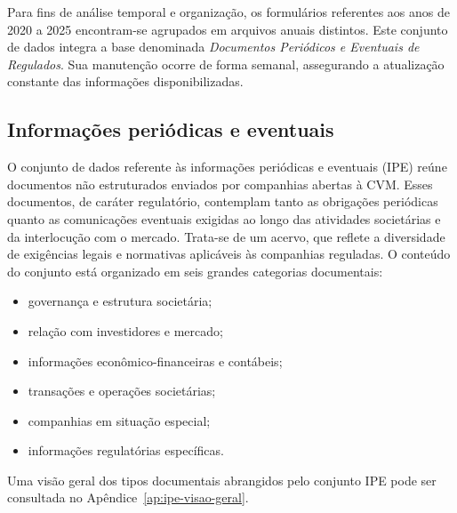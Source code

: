 Para fins de análise temporal e organização, os formulários referentes aos anos de 2020 a 2025 encontram-se agrupados em arquivos anuais distintos. Este conjunto de dados integra a base denominada \textit{Documentos Periódicos e Eventuais de Regulados}. Sua manutenção ocorre de forma semanal, assegurando a atualização constante das informações disponibilizadas.

\subsection{Informações periódicas e eventuais}

O conjunto de dados referente às informações periódicas e eventuais (IPE) reúne documentos não estruturados enviados por companhias abertas à CVM. Esses documentos, de caráter regulatório, contemplam tanto as obrigações periódicas quanto as comunicações eventuais exigidas ao longo das atividades societárias e da interlocução com o mercado. Trata-se de um acervo, que reflete a diversidade de exigências legais e normativas aplicáveis às companhias reguladas. O conteúdo do conjunto está organizado em seis grandes categorias documentais:

\begin{itemize}
	\item governança e estrutura societária;
	\item relação com investidores e mercado;
	\item informações econômico-financeiras e contábeis;
	\item transações e operações societárias;
	\item companhias em situação especial;
	\item informações regulatórias específicas.
\end{itemize}

Uma visão geral dos tipos documentais abrangidos pelo conjunto IPE pode ser consultada no Apêndice~\ref{ap:ipe-visao-geral}.

